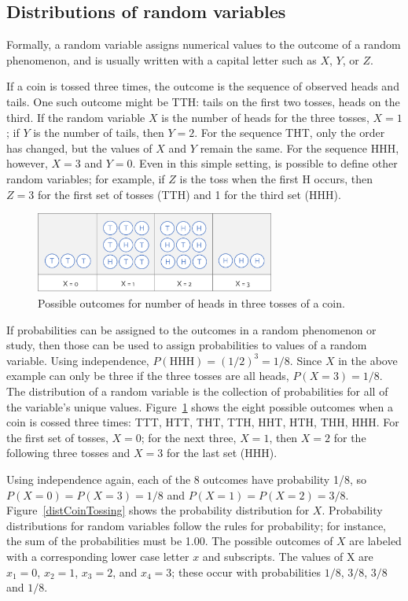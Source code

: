 \subsection{Distributions of random variables}

Formally, a random variable assigns numerical values to the outcome of a random phenomenon, and is usually written with a capital letter such as $X$, $Y$, or $Z$. 

If a coin is tossed three times, the outcome is the sequence of observed heads and tails. One such outcome might be TTH: tails on the first two tosses, heads on the third. If the random variable $X$ is the number of heads for the three tosses, $X=1$; if $Y$ is the number of tails, then $Y=2$. For the sequence THT, only the order has changed, but the values of $X$ and $Y$ remain the same. For the sequence HHH, however, $X=3$ and $Y=0$. Even in this simple setting, is possible to define other random variables; for example, if $Z$ is the toss when the first H occurs, then $Z=3$ for the first set of tosses (TTH) and 1 for the third set (HHH).  

\begin{figure}[h]
	\centering
	\includegraphics[width=0.70\textwidth]
	{ch_distributions_oi_biostat/figures/coinToss/coinToss.png}
	\caption{Possible outcomes for number of heads in three tosses of a coin.}
	\label{coinToss}
\end{figure}

If probabilities can be assigned to the outcomes in a random phenomenon or study, then those can be used to assign probabilities to values of a random variable.  Using independence, $P(\text{HHH}) = (1/2)^3 = 1/8$.  Since $X$ in the above example can only be three if the three tosses are all heads, $P(X=3) = 1/8$.  The distribution of a random variable is the collection of probabilities for all of the variable's unique values. Figure~\ref{coinToss} shows the eight possible outcomes when a coin is cossed three times: TTT, HTT, THT, TTH, HHT, HTH, THH, HHH. For the first set of tosses, $X = 0$; for the next three, $X=1$, then $X=2$ for the following three tosses and $X=3$ for the last set (HHH).  

Using independence again, each of the 8 outcomes have probability 1/8, so $P(X = 0) = P(X = 3) = 1/8$ and $P(X = 1) = P(X = 2) = 3/8$. Figure~\ref{distCoinTossing} shows the probability distribution for $X$.  Probability distributions for random variables follow the rules for probability; for instance, the sum of the probabilities must be 1.00.  The possible outcomes of $X$ are labeled with a corresponding lower case letter $x$ and subscripts.  The values of X are $x_1=0$, $x_2=1$,  $x_3 = 2$, and $x_4 = 3$; these occur with probabilities $1/8$, $3/8$, $3/8$ and $1/8$.


